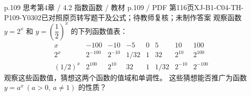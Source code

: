 \par\noindent\begin{minipage}{\linewidth}
\begin{bankitem}{p.109 思考}{第4章 / 4.2 指数函数 / 教材 p.109 / PDF 第116页}{XJ-B1-C04-TH-P109-Y0302}{已对照原页转写题干及公式；待教师复核；未制作答案}
观察函数 $y=2^x$ 和 $y=\left(\dfrac12\right)^x$ 的下列函数值表：
\[\begin{array}{c|rrrrrrr}
x&-100&-10&-5&0&5&10&100\\\hline
2^x&2^{-100}&2^{-10}&1/32&1&32&2^{10}&2^{100}\\
(1/2)^x&2^{100}&2^{10}&32&1&1/32&2^{-10}&2^{-100}
\end{array}\]
观察这些函数值，猜想这两个函数的值域和单调性。
这些猜想能否推广为函数 $y=a^x\ (a>0,\ a\ne1)$ 的性质？
\end{bankitem}
\end{minipage}\par\medskip
